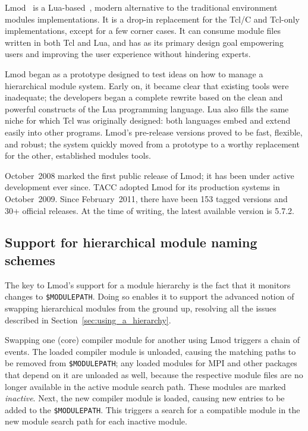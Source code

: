 Lmod~\cite{laytonLmod,taccSecretSauce,taccLmod} is a Lua-based~\cite{LuaBook},
modern alternative to the traditional environment modules implementations.
It is a drop-in replacement for the Tcl/C
and Tcl-only implementations, except for a few corner cases.
It can consume module files written in both Tcl and
Lua, and has as its primary design goal empowering users
and improving the user experience without hindering experts.

Lmod began as a prototype designed to test ideas on how to manage a hierarchical
module system.  Early on, it became clear that existing tools were inadequate; 
the developers began a complete rewrite based on the clean
and powerful constructs of the Lua programming language.
Lua also fills the same niche for which Tcl was
originally designed: both languages embed and extend easily into
other programs.  Lmod's pre-release versions proved to be
fast, flexible, and robust; the system quickly moved from
a prototype to a worthy replacement for the other, established modules tools.

October~2008 marked the first public release of Lmod; it has been under active
development ever since. TACC adopted Lmod for its production systems in October~2009.
Since February~2011, there have been 153 tagged versions and 30+ official releases.
At the time of writing, the latest available version is 5.7.2.

\subsection{Support for hierarchical module naming schemes}

The key to Lmod's support for a module hierarchy is the fact that it monitors
changes to \texttt{\small \$MODULEPATH}. Doing so enables it to support the
advanced notion of swapping hierarchical modules from the ground up, resolving all
the issues described in Section~\ref{sec:using_a_hierarchy}.

Swapping one (core) compiler module for another using Lmod triggers
a chain of events.  The loaded compiler module is unloaded, 
causing the matching paths to be removed from \texttt{\small \$MODULEPATH}; 
 any loaded modules for MPI and other packages that depend on it
are unloaded as well, because the respective module files are no longer available
in the active module search path. These modules are marked \emph{inactive}.
Next, the new compiler module is loaded, causing new entries
to be added to the \texttt{\small \$MODULEPATH}. This triggers a search
for a compatible module in the new module search path for each inactive module.


